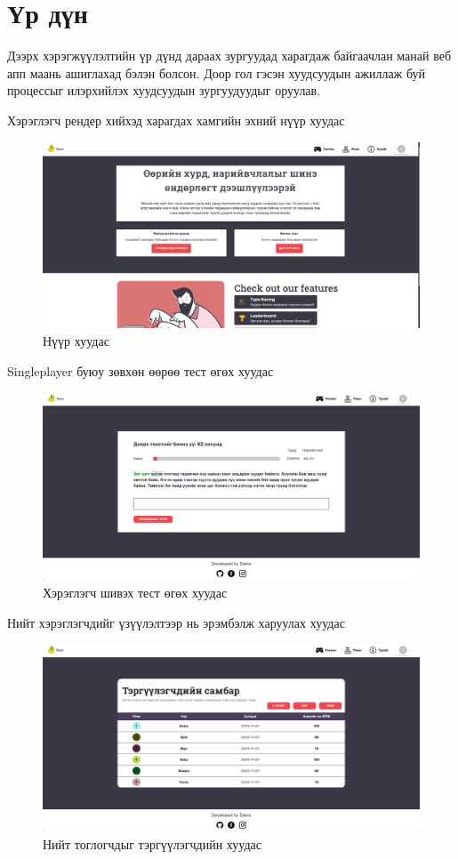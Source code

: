 \chapter{Үр дүн}

Дээрх хэрэгжүүлэлтийн үр дүнд дараах зургуудад харагдаж байгаачлан манай веб апп маань ашиглахад бэлэн болсон. Доор гол гэсэн хуудсуудын ажиллаж буй процессыг илэрхийлэх хуудсуудын зургуудуудыг оруулав.


Хэрэглэгч рендер хийхэд харагдах хамгийн эхний нүүр хуудас
\begin{figure}[h]
	\centering
	\includegraphics[width=13cm]{images/result/homepage.png}
	\caption{Нүүр хуудас}
	\label{fig:results}
\end{figure}

Singleplayer буюу зөвхөн өөрөө тест өгөх хуудас
\begin{figure}[h]
	\centering
	\includegraphics[width=13cm]{images/result/playpage.png}
	\caption{Хэрэглэгч шивэх тест өгөх хуудас}
	\label{fig:results}
\end{figure}

\clearpage
Нийт хэрэглэгчдийг үзүүлэлтээр нь эрэмбэлж харуулах хуудас
\begin{figure}[h]
	\centering
	\includegraphics[width=13cm]{images/result/rankpage.png}
	\caption{Нийт тоглогчдыг тэргүүлэгчдийн хуудас}
	\label{fig:results}
\end{figure}

